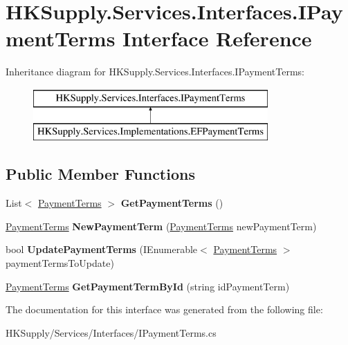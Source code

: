 \hypertarget{interface_h_k_supply_1_1_services_1_1_interfaces_1_1_i_payment_terms}{}\section{H\+K\+Supply.\+Services.\+Interfaces.\+I\+Payment\+Terms Interface Reference}
\label{interface_h_k_supply_1_1_services_1_1_interfaces_1_1_i_payment_terms}
Inheritance diagram for H\+K\+Supply.\+Services.\+Interfaces.\+I\+Payment\+Terms\+:\begin{figure}[H]
\begin{center}
\leavevmode
\includegraphics[height=2.000000cm]{interface_h_k_supply_1_1_services_1_1_interfaces_1_1_i_payment_terms}
\end{center}
\end{figure}
\subsection*{Public Member Functions}
\begin{DoxyCompactItemize}
\item 
\mbox{\label{interface_h_k_supply_1_1_services_1_1_interfaces_1_1_i_payment_terms_a8eb6a1a8485ddfd2b07975eddcb1a517}} 
List$<$ \mbox{\hyperlink{class_h_k_supply_1_1_models_1_1_payment_terms}{Payment\+Terms}} $>$ {\bfseries Get\+Payment\+Terms} ()
\item 
\mbox{\label{interface_h_k_supply_1_1_services_1_1_interfaces_1_1_i_payment_terms_aa8652a013c7dc1a653e365b298e59a4c}} 
\mbox{\hyperlink{class_h_k_supply_1_1_models_1_1_payment_terms}{Payment\+Terms}} {\bfseries New\+Payment\+Term} (\mbox{\hyperlink{class_h_k_supply_1_1_models_1_1_payment_terms}{Payment\+Terms}} new\+Payment\+Term)
\item 
\mbox{\label{interface_h_k_supply_1_1_services_1_1_interfaces_1_1_i_payment_terms_ab88f26d82eb00b791a6c0f1bcaa148ec}} 
bool {\bfseries Update\+Payment\+Terms} (I\+Enumerable$<$ \mbox{\hyperlink{class_h_k_supply_1_1_models_1_1_payment_terms}{Payment\+Terms}} $>$ payment\+Terms\+To\+Update)
\item 
\mbox{\label{interface_h_k_supply_1_1_services_1_1_interfaces_1_1_i_payment_terms_aee071ca2afca623ebb6ae3716c4cbd74}} 
\mbox{\hyperlink{class_h_k_supply_1_1_models_1_1_payment_terms}{Payment\+Terms}} {\bfseries Get\+Payment\+Term\+By\+Id} (string id\+Payment\+Term)
\end{DoxyCompactItemize}


The documentation for this interface was generated from the following file\+:\begin{DoxyCompactItemize}
\item 
H\+K\+Supply/\+Services/\+Interfaces/I\+Payment\+Terms.\+cs\end{DoxyCompactItemize}

